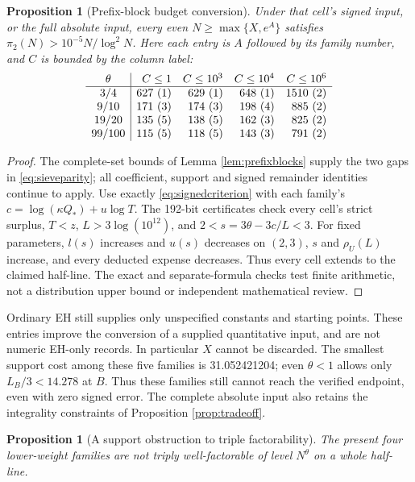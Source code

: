 \documentclass[11pt]{article}
\newtheorem{proposition}[theorem]{Proposition}
\begin{document}
\begin{proposition}[Prefix-block budget conversion]\label{prop:prefixdistribution}
Under that cell's signed input, or the full absolute input, every even
$N\ge\max\{X,e^A\}$ satisfies $\pi_2(N)>10^{-5}N/\log^2N$.
Here each entry is $A$ followed by its family number, and $C$ is bounded
by the column label:
\[
\begin{array}{c|rrrr}
\theta&C\le1&C\le10^3&C\le10^4&C\le10^6\\\hline
$3/4$ & $627\ (1)$ & $629\ (1)$ & $648\ (1)$ & $1510\ (2)$\\
$9/10$ & $171\ (3)$ & $174\ (3)$ & $198\ (4)$ & $885\ (2)$\\
$19/20$ & $135\ (5)$ & $138\ (5)$ & $162\ (3)$ & $825\ (2)$\\
$99/100$ & $115\ (5)$ & $118\ (5)$ & $143\ (3)$ & $791\ (2)$\\
\end{array}
\]
\end{proposition}
\begin{proof}
The complete-set bounds of Lemma \ref{lem:prefixblocks} supply the two
gaps in \eqref{eq:sieveparity}; all coefficient, support and signed
remainder identities continue to apply. Use exactly
\eqref{eq:signedcriterion} with each family's $c=\log(\kappa Q_*)+u\log T$.
The 192-bit certificates check every cell's strict surplus, $T<z$,
$L>3\log(10^{12})$, and $2<s=3\theta-3c/L<3$.
For fixed parameters, $l(s)$ increases and $u(s)$ decreases on $(2,3)$,
$s$ and $\rho_U(L)$ increase, and every deducted expense decreases.
Thus every cell extends to the claimed half-line.
The exact and separate-formula checks test finite arithmetic, not a
distribution upper bound or independent mathematical review.
\end{proof}
Ordinary EH still supplies only unspecified constants and starting points.
These entries improve the conversion of a supplied quantitative input,
and are not numeric EH-only records. In particular $X$ cannot be discarded.
The smallest support cost among these five families is 31.052421204;
even $\theta<1$ allows only $L_B/3<14.278$ at $B$.
Thus these families still cannot reach the verified endpoint, even with
zero signed error. The complete absolute input also retains the integrality
constraints of Proposition \ref{prop:tradeoff}.
\begin{proposition}[A support obstruction to triple factorability]
\label{prop:factorability}
The present four lower-weight families are not triply well-factorable
of level $N^\theta$ on a whole half-line.
\end{proposition}
\end{document}
